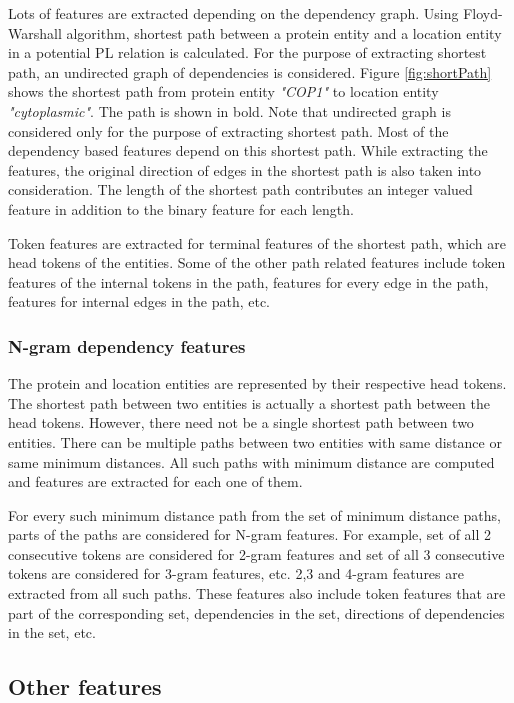 Lots of features are extracted depending on the dependency graph. Using Floyd-Warshall algorithm, shortest path between a protein entity and a location entity in a potential PL relation is calculated. For the purpose of extracting shortest path, an undirected graph of dependencies is considered. Figure \ref{fig:shortPath} shows the shortest path from protein entity \textit{"COP1"} to location entity \textit{"cytoplasmic"}. The path is shown in bold. Note that undirected graph is considered only for the purpose of extracting shortest path.  Most of the dependency based features depend on this shortest path. While extracting the features, the original direction of edges in the shortest path is also taken into consideration. The length of the shortest path contributes an integer valued feature in addition to the binary feature for each length.

Token features are extracted for terminal features of the shortest path, which are head tokens of the entities. Some of the other path related features include token features of the internal tokens in the path, features for every edge in the path, features for internal edges in the path, etc.

\subsubsection*{N-gram dependency features}

The protein and location entities are represented by their respective head tokens.  The shortest path between two entities is actually a shortest path between the head tokens. However, there need not be a single shortest path between two entities. There can be multiple paths between two entities with same distance or same minimum distances. All such paths with minimum distance are computed and features are extracted for each one of them.

For every such minimum distance path from the set of minimum distance paths, parts of the paths are considered for N-gram features. For example, set of all 2 consecutive tokens are considered for 2-gram features and set of all 3 consecutive tokens are considered for 3-gram features, etc. 2,3 and 4-gram features are extracted from all such paths. These features also include token features that are part of the corresponding set, dependencies in the set, directions of dependencies in the set, etc.

\subsection*{Other features}

